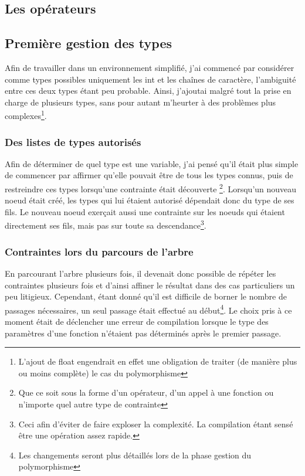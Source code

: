 \documentclass[12pt]{article}
\begin{document}
\subsection{Les opérateurs}


\subsection{Première gestion des types}
Afin de travailler dans un environnement simplifié, j'ai commencé par
considérer comme types possibles uniquement les int et les chaînes de
caractère, l'ambiguité entre ces deux types étant peu probable. Ainsi,
j'ajoutai malgré tout la prise en charge de plusieurs types, sans pour autant
m'heurter à des problèmes plus complexes\footnote{L'ajout de float engendrait
en effet une obligation de traiter (de manière plus ou moins complète) le cas
du polymorphisme}.

\subsubsection{Des listes de types autorisés}
Afin de déterminer de quel type est une variable, j'ai pensé qu'il était plus
simple de commencer par affirmer qu'elle pouvait être de tous les types
connus, puis de restreindre ces types lorsqu'une contrainte était découverte
\footnote{Que ce soit sous la forme d'un opérateur, d'un appel à une fonction
ou n'importe quel autre type de contrainte}. Lorsqu'un nouveau noeud était
créé, les types qui lui étaient autorisé dépendait donc du type de ses fils.
Le nouveau noeud exerçait aussi une contrainte sur les noeuds qui étaient
directement ses fils, mais pas sur toute sa descendance\footnote{Ceci afin
d'éviter de faire exploser la complexité. La compilation étant sensé être une
opération assez rapide.}.

\subsubsection{Contraintes lors du parcours de l'arbre}
En parcourant l'arbre plusieurs fois, il devenait donc possible de répéter
les contraintes plusieurs fois et d'ainsi affiner le résultat dans des cas
particuliers un peu litigieux. Cependant, étant donné qu'il est difficile
de borner le nombre de passages nécessaires, un seul passage était effectué
au début\footnote{Les changements seront plus détaillés lors de la phase
gestion du polymorphisme}. Le choix pris à ce moment était de déclencher une
erreur de compilation lorsque le type des paramètres d'une fonction n'étaient
pas déterminés après le premier passage.
\end{document}

